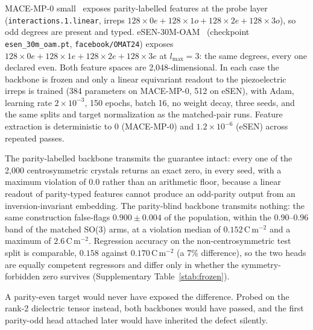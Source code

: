 MACE-MP-0 small~\cite{batatia2023foundation} exposes parity-labelled features at the probe layer (\texttt{interactions.1.linear}, irreps $128{\times}0e+128{\times}1o+128{\times}2e+128{\times}3o$), so odd degrees are present and typed. eSEN-30M-OAM~\cite{fu2025esen,barrosoluque2024omat24} (checkpoint \texttt{esen\_30m\_oam.pt}, \texttt{facebook/OMAT24}) exposes $128{\times}0e+128{\times}1e+128{\times}2e+128{\times}3e$ at $l_{\max}=3$: the same degrees, every one declared even. Both feature spaces are 2,048-dimensional. In each case the backbone is frozen and only a linear equivariant readout to the piezoelectric irreps is trained (384 parameters on MACE-MP-0, 512 on eSEN), with Adam, learning rate $2\times10^{-3}$, 150 epochs, batch 16, no weight decay, three seeds, and the same splits and target normalization as the matched-pair runs. Feature extraction is deterministic to $0$ (MACE-MP-0) and $1.2\times10^{-6}$ (eSEN) across repeated passes.

The parity-labelled backbone transmits the guarantee intact: every one of the 2,000 centrosymmetric crystals returns an exact zero, in every seed, with a maximum violation of $0.0$ rather than an arithmetic floor, because a linear readout of parity-typed features cannot produce an odd-parity output from an inversion-invariant embedding. The parity-blind backbone transmits nothing: the same construction false-flags $0.900 \pm 0.004$ of the population, within the $0.90$--$0.96$ band of the matched SO(3) arms, at a violation median of $0.152$\,C\,m$^{-2}$ and a maximum of $2.6$\,C\,m$^{-2}$. Regression accuracy on the non-centrosymmetric test split is comparable, $0.158$ against $0.170$\,C\,m$^{-2}$ (a 7\% difference), so the two heads are equally competent regressors and differ only in whether the symmetry-forbidden zero survives (Supplementary Table~\ref{stab:frozen}).

A parity-even target would never have exposed the difference. Probed on the rank-2 dielectric tensor instead, both backbones would have passed, and the first parity-odd head attached later would have inherited the defect silently.

